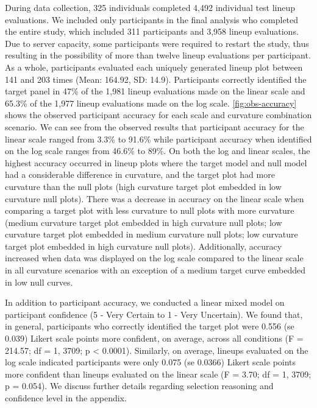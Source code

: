 \documentclass[12pt]{article}
\begin{document}
During data collection, 325 individuals completed 4,492 individual test
lineup evaluations. We included only participants in the final analysis
who completed the entire study, which included 311 participants and
3,958 lineup evaluations. Due to server capacity, some participants were
required to restart the study, thus resulting in the possibility of more
than twelve lineup evaluations per participant. As a whole, participants
evaluated each uniquely generated lineup plot between 141 and 203 times
(Mean: 164.92, SD: 14.9). Participants correctly identified the target
panel in 47\% of the 1,981 lineup evaluations made on the linear scale
and 65.3\% of the 1,977 lineup evaluations made on the log scale.
\cref{fig:obs-accuracy} shows the observed participant accuracy for each
scale and curvature combination scenario. We can see from the observed
results that participant accuracy for the linear scale ranged from 3.3\%
to 91.6\% while participant accuracy when identified on the log scale
ranges from 46.6\% to 89\%. On both the log and linear scales, the
highest accuracy occurred in lineup plots where the target model and
null model had a considerable difference in curvature, and the target
plot had more curvature than the null plots (high curvature target plot
embedded in low curvature null plots). There was a decrease in accuracy
on the linear scale when comparing a target plot with less curvature to
null plots with more curvature (medium curvature target plot embedded in
high curvature null plots; low curvature target plot embedded in medium
curvature null plots; low curvature target plot embedded in high
curvature null plots). Additionally, accuracy increased when data was
displayed on the log scale compared to the linear scale in all curvature
scenarios with an exception of a medium target curve embedded in low
null curves.

In addition to participant accuracy, we conducted a linear mixed model
on participant confidence (5 - Very Certain to 1 - Very Uncertain). We
found that, in general, participants who correctly identified the target
plot were 0.556 (se 0.039) Likert scale points more confident, on
average, across all conditions (F = 214.57; df = 1, 3709; p \textless{}
0.0001). Similarly, on average, lineups evaluated on the log scale
indicated participants were only 0.075 (se 0.0366) Likert scale points
more confident than lineups evaluated on the linear scale (F = 3.70; df
= 1, 3709; p = 0.054). We discuss further details regarding selection
reasoning and confidence level in the appendix.
\end{document}
